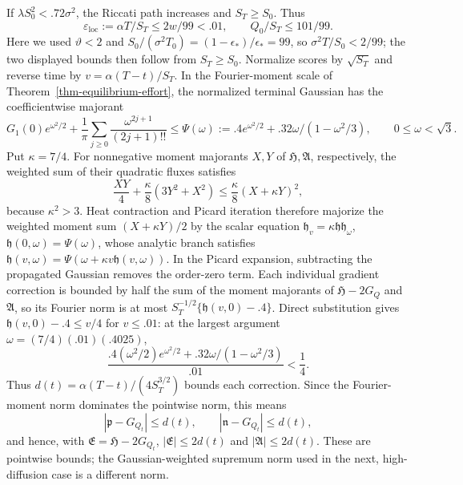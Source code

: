 \documentclass[mnsc]{informs3}
\begin{document}
\begin{APPENDICES}
{If $\lambda S_0^2<.72\sigma^2$, the Riccati path increases and
$S_T\geq S_0$. Thus
\[
\varepsilon_{\mathrm{loc}}:=\alpha T/S_T\leq2w/99<.01,\qquad Q_0/S_T\leq101/99.
\]
Here we used ${\vartheta}<2$ and
$S_0/(\sigma^2T_0)=(1-{\epsilon_*})/{\epsilon_*}=99$, so
$\sigma^2T/S_0<2/99$; the two displayed bounds then follow from
$S_T\geq S_0$.
Normalize scores by $\sqrt{S_T}$ and reverse time by
$v=\alpha(T-t)/S_T$. In the Fourier-moment scale of
Theorem~\ref{thm-equilibrium-effort}, the normalized terminal Gaussian
has the coefficientwise majorant
\[
G_1(0)e^{{\omega}^2/2}+\frac1\pi\sum_{j\geq0}
\frac{{\omega}^{2j+1}}{(2j+1)!!}
\leq\Psi({\omega}):=.4e^{{\omega}^2/2}+.32{\omega}/(1-{\omega}^2/3),\qquad 0\leq {\omega}<\sqrt3.
\]
Put $\kappa=7/4$. For nonnegative moment majorants $X,Y$ of ${\mathfrak H},{\mathfrak A}$,
respectively, the weighted sum of their quadratic fluxes satisfies
\[
\frac{XY}{4}+\frac\kappa8(3Y^2+X^2)
\leq\frac\kappa8(X+\kappa Y)^2,
\]
because $\kappa^2>3$.
Heat contraction and Picard iteration therefore majorize
the weighted moment sum $(X+\kappa Y)/2$ by the scalar equation
${\mathfrak h}_v=\kappa {\mathfrak h} {\mathfrak h}_{\omega}$, ${\mathfrak h}(0,{\omega})=\Psi({\omega})$, whose analytic branch satisfies
${\mathfrak h}(v,{\omega})=\Psi({\omega}+\kappa v{\mathfrak h}(v,{\omega}))$.
In the Picard expansion, subtracting the propagated Gaussian removes
the order-zero term. Each individual gradient correction is bounded
by half the sum of the moment majorants of ${\mathfrak H}-2G_Q$ and ${\mathfrak A}$,
so its Fourier norm is at most
$S_T^{-1/2}\{{\mathfrak h}(v,0)-.4\}$.
Direct substitution gives ${\mathfrak h}(v,0)-.4\leq v/4$ for $v\leq.01$:
at the largest argument ${\omega}=(7/4)(.01)(.4025)$,
\[
\frac{.4({\omega}^2/2)e^{{\omega}^2/2}+.32{\omega}/(1-{\omega}^2/3)}{.01}<\frac14.
\]
Thus $d(t)=\alpha(T-t)/(4S_T^{3/2})$ bounds each correction.
Since the Fourier-moment norm dominates the pointwise norm, this means
\[
|{\mathfrak p}-G_{Q_t}|\leq d(t),\qquad |{\mathfrak n}-G_{Q_t}|\leq d(t),
\]
and hence, with ${\mathfrak E}={\mathfrak H}-2G_{Q_t}$, $|{\mathfrak E}|\leq2d(t)$ and
$|{\mathfrak A}|\leq2d(t)$. These are pointwise bounds; the Gaussian-weighted
supremum norm used in the next, high-diffusion case is a different norm.

}
\end{APPENDICES}
\end{document}
